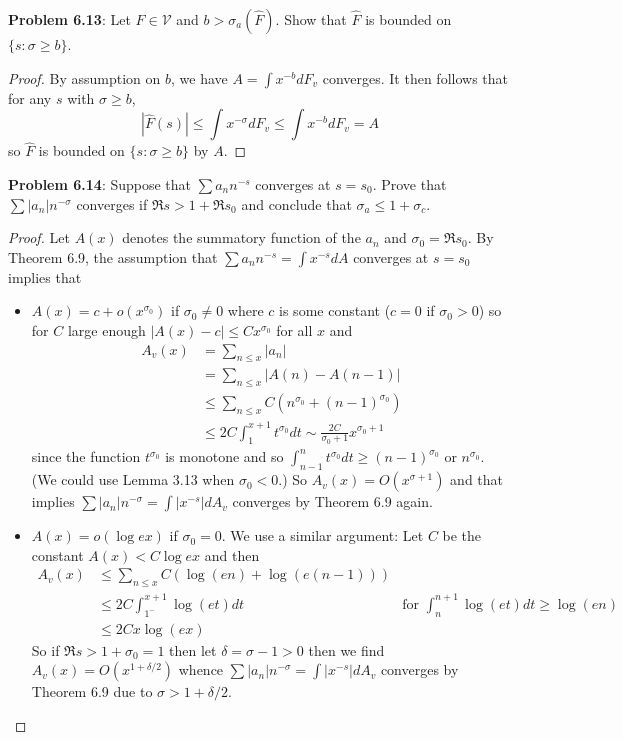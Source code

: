 \documentclass[12pt]{article}
\newcommand{\V}{\mathcal{V}}
\newcommand{\Fhat}{\widehat{F}}
\begin{document}
\fi

\textbf{Problem 6.13}: Let $F \in \V$ and $b > \sigma_a(\Fhat)$. Show that $\Fhat$ is bounded on $\{s : \sigma \geq b\}$.

\begin{proof}
By assumption on $b$, we have $A = \int x^{-b} dF_v$ converges. It then follows that for any $s$ with $\sigma \geq b$,
$$|\Fhat(s)| \leq \int x^{-\sigma} dF_v \leq \int x^{-b} dF_v = A$$
so $\Fhat$ is bounded on $\{s : \sigma \geq b\}$ by $A$.
\end{proof}

\textbf{Problem 6.14}: Suppose that $\sum a_n n^{-s}$ converges at $s = s_0$. Prove that $\sum |a_n| n^{-\sigma}$ converges if $\Re s > 1 + \Re s_0$ and conclude that $\sigma_a \leq 1 + \sigma_c$.

\begin{proof}
Let $A(x)$ denotes the summatory function of the $a_n$ and $\sigma_0 = \Re s_0$. By Theorem 6.9, the assumption that $\sum a_n n^{-s} = \int x^{-s} dA$ converges at $s = s_0$ implies that
\begin{itemize}
\item $A(x) = c + o(x^{\sigma_0})$ if $\sigma_0 \not= 0$ where $c$ is some constant ($c = 0$ if $\sigma_0 > 0$) so for $C$ large enough $|A(x) - c| \leq C x^{\sigma_0}$ for all $x$ and
\begin{align*}
A_v(x) &= \sum_{n \leq x} |a_n|\\
&= \sum_{n \leq x} |A(n) - A(n-1)|\\
&\leq \sum_{n \leq x} C (n^{\sigma_0} + (n-1)^{\sigma_0})\\
&\leq 2C \int_1^{x+1} t^{\sigma_0} dt \sim \frac{2C}{\sigma_0 + 1} x^{\sigma_0 + 1}
\end{align*}
since the function $t^{\sigma_0}$ is monotone and so $\int_{n-1}^n t^{\sigma_0} dt \geq (n-1)^{\sigma_0}$ or $n^{\sigma_0}$. (We could use Lemma 3.13 when $\sigma_0 < 0$.) So $A_v(x) = O(x^{\sigma+1})$ and that implies $\sum |a_n| n^{-\sigma} = \int |x^{-s}| dA_v$ converges by Theorem 6.9 again.

\item $A(x) = o(\log ex)$ if $\sigma_0 = 0$. We use a similar argument: Let $C$ be the constant $A(x) < C \log ex$ and then
\begin{align*}
A_v(x) &\leq \sum_{n \leq x} C (\log (en) + \log (e(n-1)))\\
&\leq 2C \int_{1^-}^{x+1} \log(et) dt &\text{for } \int_n^{n+1} \log(et) dt \geq \log(en)\\
&\leq 2C x \log (ex)
\end{align*}
So if $\Re s > 1 + \sigma_0 = 1$ then let $\delta = \sigma - 1 > 0$ then we find $A_v(x) = O(x^{1+\delta/2})$ whence $\sum |a_n| n^{-\sigma} = \int |x^{-s}| dA_v$ converges by Theorem 6.9 due to $\sigma > 1 + \delta/2$.
\end{itemize}
\end{proof}

\unless\ifdefined\IsMainDocument
\end{document}
